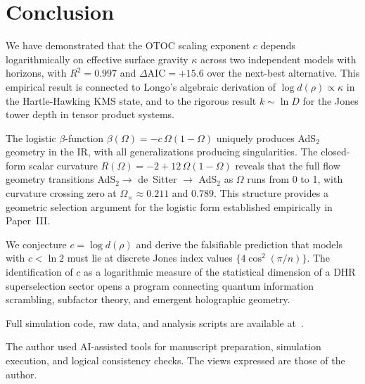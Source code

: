\documentclass[aps,prl,twocolumn,superscriptaddress,showpacs]{revtex4-2}
\begin{document}
\section{Conclusion}

We have demonstrated that the OTOC scaling exponent $c$ depends
logarithmically on effective surface gravity $\kappa$ across two
independent models with horizons, with $R^2 = 0.997$ and
$\Delta\mathrm{AIC} = +15.6$ over the next-best alternative. This
empirical result is connected to Longo's algebraic derivation of
$\log d(\rho) \propto \kappa$ in the Hartle-Hawking KMS state, and to
the rigorous result $k \sim \ln D$ for the Jones tower depth in tensor
product systems.

The logistic $\beta$-function $\beta(\Omega) = -c\,\Omega(1-\Omega)$
uniquely produces AdS$_2$ geometry in the IR, with all generalizations
producing singularities. The closed-form scalar curvature
$R(\Omega) = -2 + 12\,\Omega(1-\Omega)$ reveals that the full flow
geometry transitions AdS$_2 \to$ de~Sitter $\to$ AdS$_2$ as $\Omega$
runs from 0 to 1, with curvature crossing zero at
$\Omega_\times \approx 0.211$ and $0.789$. This structure provides a
geometric selection argument for the logistic form established empirically
in Paper~III.

We conjecture $c = \log d(\rho)$ and derive the falsifiable prediction
that models with $c < \ln 2$ must lie at discrete Jones index values
$\{4\cos^2(\pi/n)\}$. The identification of $c$ as a logarithmic
measure of the statistical dimension of a DHR superselection sector
opens a program connecting quantum information scrambling, subfactor
theory, and emergent holographic geometry.

Full simulation code, raw data, and analysis scripts are available
at~\cite{PerezEugenio2026e}.

The author used AI-assisted tools for manuscript preparation, simulation
execution, and logical consistency checks. The views expressed are those
of the author.


\end{document}
